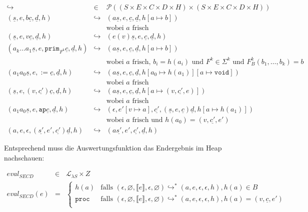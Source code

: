 \begin{eqnarray*}
  \hookrightarrow &\in& \mathcal{P}((S\times E\times C\times D\times H) \times (S\times E\times C\times D\times H))\\
  (\underline{s}, e, b\underline{c}, \underline{d}, h)
  &\hookrightarrow& 
  (a\underline{s}, e, \underline{c}, \underline{d}, h[a \mapsto b] )
  \\ && \textrm{wobei $a$ frisch}
  \\
  (\underline{s}, e, v\underline{c}, \underline{d}, h)
  &\hookrightarrow&
  (e(v)\underline{s}, e, \underline{c}, \underline{d}, h)
  \\
  (a_k\ldots a_1\underline{s}, e, \mathtt{prim}_{F^k}\underline{c},
  \underline{d}, h)
  &\hookrightarrow&
  (a\underline{s}, e, \underline{c}, \underline{d}, h[a\mapsto b] )
  \\ && \textrm{wobei $a$ frisch, $b_i = h(a_i)$ und $F^k\in\Sigma^k$ und $F^k_B(b_1,\ldots,b_k) = b$}
  \\
  (a_1a_0\underline{s}, e, \mathtt{:=} \underline{c}, \underline{d}, h)
  &\hookrightarrow&
  (a\underline{s}, e, \underline{c}, \underline{d}, h[a_0 \mapsto
  h(a_1)][a\mapsto \mathtt{void}] )
  \\ && \textrm{wobei $a$ frisch}
  \\
  (\underline{s}, e, (v, \underline{c'})\underline{c}, \underline{d},
  h)
  &\hookrightarrow&
  (a\underline{s}, e, \underline{c}, \underline{d}, h[a \mapsto (v,
  \underline{c'}, e)] )
  \\ && \textrm{wobei $a$ frisch}
  \\
  (a_1a_0\underline{s}, e, \mathtt{ap}\underline{c}, \underline{d}, h)
  &\hookrightarrow&
  (\epsilon, e'[v\mapsto a], \underline{c'}, (\underline{s}, e,
  \underline{c}) \underline{d}, h[a\mapsto h(a_1)])
  \\ && \textrm{wobei $a$ frisch und $h(a_0) = (v, \underline{c'}, e')$}
  \\
  (a, e, \epsilon, (\underline{s'}, e', \underline{c'}) \underline{d}, h)
  &\hookrightarrow&
  (a\underline{s'}, e', \underline{c'}, \underline{d}, h)
\end{eqnarray*}

Entsprechend muss die Auswertungsfunktion das Endergebnis im Heap nachschauen:

\begin{eqnarray*}
  \mathit{eval}_\mathit{SECD} & \in & \mathcal{L}_{\lambda{}S} \times Z\\
  \mathit{eval}_\mathit{SECD}(e) & = &
  \begin{cases}
    h(a) & \textrm{falls } (\epsilon, \varnothing, \llbracket
    e\rrbracket, \epsilon, \varnothing)
    \hookrightarrow^* (a, e, \epsilon, \epsilon, h), h(a) \in B\\
    \texttt{proc} & \textrm{falls } (\epsilon, \varnothing, \llbracket e\rrbracket, \epsilon,\varnothing)
    \hookrightarrow^* (a, e, \epsilon, \epsilon, h), h(a) = (v, \underline{c}, e')\\
  \end{cases}
\end{eqnarray*}



